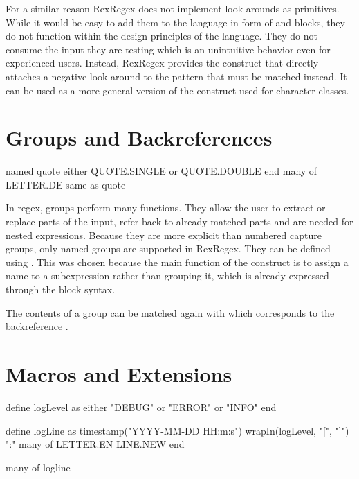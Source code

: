 For a similar reason RexRegex does not implement look-arounds as primitives. While it would be easy to add them to the language in form of  and  blocks, they do not function within the design principles of the language. They do not consume the input they are testing which is an unintuitive behavior even for experienced users. Instead, RexRegex provides the  construct that directly attaches a negative look-around to the pattern that must be matched instead. It can be used as a more general version of the  construct used for character classes.

\section{Groups and Backreferences}

\begin{rexregexBox}[label=code:dslGroupsAndBackrefs,title=Groups and Backreferences in RexRegex]
named quote
    either QUOTE.SINGLE or QUOTE.DOUBLE
end
many of LETTER.DE
same as quote
\end{rexregexBox}

In regex, groups perform many functions. They allow the user to extract or replace parts of the input, refer back to already matched parts and are needed for nested expressions. Because they are more explicit than numbered capture groups, only named groups are supported in RexRegex. They can be defined using . This was chosen because the main function of the construct is to assign a name to a subexpression rather than grouping it, which is already expressed through the block syntax.

The contents of a group can be matched again with  which corresponds to the backreference . 

\section{Macros and Extensions} \label{sec:macros}

\begin{rexregexBox}[float=htb,label=code:dslMacros,title=Macros in RexRegex,width=12cm,center]
define logLevel as
    either "DEBUG" or "ERROR" or "INFO"
end

define logLine as
    timestamp("YYYY-MM-DD HH:m:s")
    wrapIn(logLevel, "[", "]")
    ":"
    many of LETTER.EN
    LINE.NEW
end

many of logline
\end{rexregexBox}

